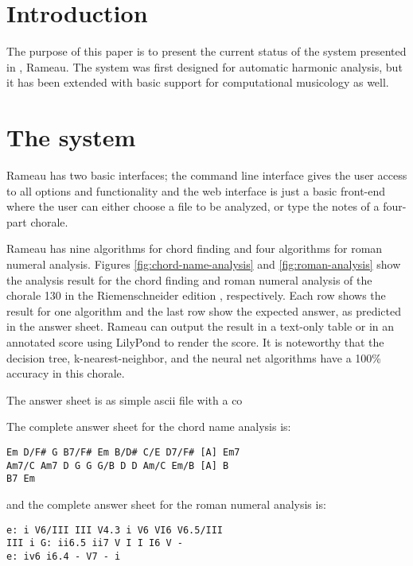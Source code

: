 \section{Introduction}

The purpose of this paper is to present the current status of the
system presented in \cite{kroger08:rameau}, Rameau. The system was
first designed for automatic harmonic analysis, but it has been
extended with basic support for computational musicology as well.

\section{The system}
\label{sec:system}

Rameau has two basic interfaces; the command line interface gives the
user access to all options and functionality and the web interface is
just a basic front-end where the user can either choose a file to be
analyzed, or type the notes of a four-part chorale.

Rameau has nine algorithms for chord finding and four algorithms for
roman numeral analysis. Figures \ref{fig:chord-name-analysis} and
\ref{fig:roman-analysis} show the analysis result for the chord
finding and roman numeral analysis of the chorale 130 in the
Riemenschneider edition \cite{bach41:371} , respectively. Each row
shows the result for one algorithm and the last row show the expected
answer, as predicted  in the answer sheet.
Rameau can output the result in a text-only table or in an annotated
score using LilyPond \cite{nienhuys.ea08:LilyPond} to render the
score. It is noteworthy that the decision tree, k-nearest-neighbor,
and the neural net algorithms have a 100\% accuracy in this chorale.

The answer sheet is as simple ascii file with a co 

The complete answer sheet for the chord name analysis is:

\begin{verbatim}
Em D/F# G B7/F# Em B/D# C/E D7/F# [A] Em7
Am7/C Am7 D G G G/B D D Am/C Em/B [A] B 
B7 Em
\end{verbatim}

and the complete answer sheet for the roman numeral analysis is:

\begin{verbatim}
e: i V6/III III V4.3 i V6 VI6 V6.5/III
III i G: ii6.5 ii7 V I I I6 V -
e: iv6 i6.4 - V7 - i
\end{verbatim}


